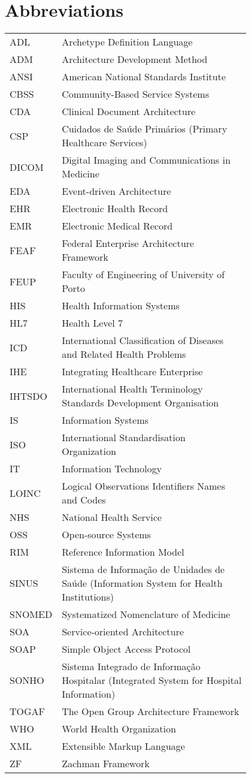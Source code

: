 \chapter*{Abbreviations}

\begin{flushleft}
\begin{tabular}{l p{0.8\linewidth}}
ADL		& Archetype Definition Language \\
ADM		& Architecture Development Method \\
ANSI	& American National Standards Institute \\
CBSS	& Community-Based Service Systems \\
CDA		& Clinical Document Architecture \\
CSP		& Cuidados de Saúde Primários (Primary Healthcare Services) \\
DICOM	& Digital Imaging and Communications in Medicine \\
EDA		& Event-driven Architecture \\
EHR		& Electronic Health Record \\
EMR		& Electronic Medical Record \\
FEAF	& Federal Enterprise Architecture Framework \\
FEUP	& Faculty of Engineering of University of Porto \\
HIS		& Health Information Systems \\
HL7		& Health Level 7 \\
ICD		& International Classification of Diseases and Related Health Problems \\
IHE		& Integrating Healthcare Enterprise \\
IHTSDO  & International Health Terminology Standards Development Organisation \\
IS		& Information Systems \\
ISO		& International Standardisation Organization \\
IT		& Information Technology \\
LOINC   & Logical Observations Identifiers Names and Codes \\
NHS		& National Health Service \\
OSS		& Open-source Systems \\
RIM		& Reference Information Model \\
SINUS	& Sistema de Informação de Unidades de Saúde (Information System for Health Institutions)\\
SNOMED	& Systematized Nomenclature of Medicine \\
SOA		& Service-oriented Architecture \\
SOAP	& Simple Object Access Protocol \\
SONHO	& Sistema Integrado de Informação Hospitalar (Integrated System for Hospital Information) \\
TOGAF   & The Open Group Architecture Framework \\
WHO		& World Health Organization \\
XML	    & Extensible Markup Language \\
ZF		& Zachman Framework 
\end{tabular}
\end{flushleft}

